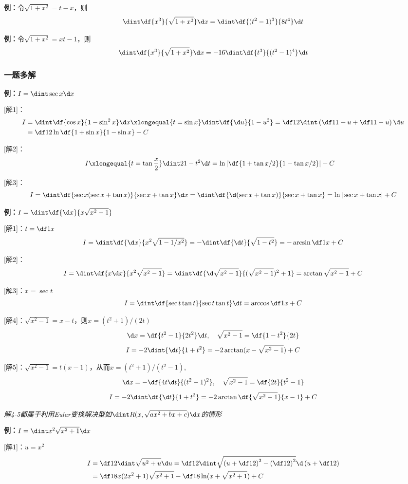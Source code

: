 {\bf 例：}令$\sqrt{1+x^2}=t-x$，则
$$\dint\df{x^3}{\sqrt{1+x^2}}\d x=\dint\df{(t^2-1)^3}{8t^4}\d t$$

{\bf 例：}令$\sqrt{1+x^2}=xt-1$，则
$$\dint\df{x^3}{\sqrt{1+x^2}}\d x=-16\dint\df{t^3}{(t^2-1)^4}\d t$$

\subsubsection{一题多解}

{\bf 例：}$I=\dint\sec x\d x$

[解1]：
\begin{align}
	I&=\dint\df{\cos x}{1-\sin^2x}\d x
	\xlongequal{t=\sin x}\dint\df{\d u}{1-u^2}
	=\df12\dint\left(\df1{1+u}+\df1{1-u}\right)\d u\notag\\
	&=\df12\ln\df{1+\sin x}{1-\sin x}+C\notag
\end{align}

[解2]：
\begin{align}
	I&\xlongequal{t=\tan\frac x2}\dint2{1-t^2}\d t
	=\ln\left|\df{1+\tan x/2}{1-\tan x/2}\right|+C\notag
\end{align}

[解3]：
$$
I=\dint\df{\sec x(\sec x+\tan x)}{\sec x+\tan x}\d x
=\dint\df{\d(\sec x+\tan x)}{\sec x+\tan x}=\ln|\sec x+\tan x|+C
$$

{\bf 例：}$I=\dint\df{\d x}{x\sqrt{x^2-1}}$

[解1]：$t=\df1x$
$$I=\dint\df{\d x}{x^2\sqrt{1-1/x^2}}=-\dint\df{\d t}{\sqrt{1-t^2}}
=-\arcsin\df1x+C$$

[解2]：
$$I=\dint\df{x\d x}{x^2\sqrt{x^2-1}}=\dint\df{\d\sqrt{x^2-1}}
{(\sqrt{x^2-1})^2+1}=\arctan\sqrt{x^2-1}+C$$

[解3]：$x=\sec t$
$$I=\dint\df{\sec t\tan t}{\sec t\tan t}\d t=\arccos\df1x+C$$

[解4]：$\sqrt{x^2-1}=x-t$，则$x=(t^2+1)/(2t)$
$$\d x=\df{t^2-1}{2t^2}\d t,\quad \sqrt{x^2-1}=\df{1-t^2}{2t}$$
$$I=-2\dint{\d t}{1+t^2}=-2\arctan(x-\sqrt{x^2-1})+C$$

[解5]：$\sqrt{x^2-1}=t(x-1)$，从而$x=(t^2+1)/(t^2-1)$,
$$\d x=-\df{4t\d t}{(t^2-1)^2},\quad \sqrt{x^2-1}=\df{2t}{t^2-1}$$
$$I=-2\dint\df{\d t}{1+t^2}=-2\arctan\df{\sqrt{x^2-1}}{x-1}+C$$

{\it 解4-5都属于利用Eular变换解决型如$\dint R(x,\sqrt{ax^2+bx+c})\d x$的情形}

{\bf 例：}$I=\dint x^2\sqrt{x^2+1}\d x$

[解1]：$u=x^2$
\begin{align}
I&=\df12\dint\sqrt{u^2+u}\d u=\df12\dint\sqrt{\left(u+\df12\right)^2
-\left(\df12\right)^2}\d\left(u+\df12\right)\notag\\
&=\df18x(2x^2+1)\sqrt{x^2+1}-\df18\ln(x+\sqrt{x^2+1})+C\notag
\end{align}

